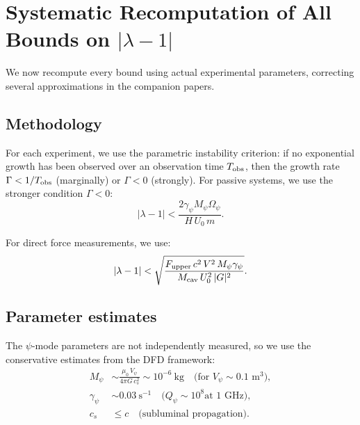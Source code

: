 \documentclass[12pt,aps,prd,twocolumn,superscriptaddress,nofootinbib]{revtex4-2}
\newcommand{\Opsi}{\Omega_\psi}
\newcommand{\gpsi}{\gamma_\psi}
\newcommand{\Mpsi}{M_\psi}
\begin{document}

\section{Systematic Recomputation of All Bounds on $|\lambda-1|$}
\label{sec:constraints}

We now recompute every bound using actual experimental parameters,
correcting several approximations in the companion papers.

\subsection{Methodology}

For each experiment, we use the parametric instability criterion:
if no exponential growth has been observed over an observation time
$T_{\rm obs}$, then the growth rate $\Gamma < 1/T_{\rm obs}$
(marginally) or $\Gamma < 0$ (strongly).  For passive systems,
we use the stronger condition $\Gamma < 0$:
\begin{equation}
|\lambda-1| < \frac{2\gpsi\Mpsi\Opsi}{H\,U_0\,m}.
\label{eq:bound_formula}
\end{equation}

For direct force measurements, we use:
\begin{equation}
|\lambda-1| < \sqrt{\frac{F_{\rm upper}\,c^2\,V^2\,\Mpsi\gpsi}
{M_{\rm cav}\,U_0^2\,|G|^2}}.
\label{eq:force_bound}
\end{equation}

\subsection{Parameter estimates}

The $\psi$-mode parameters are not independently measured, so we
use the conservative estimates from the DFD framework:
\begin{align}
\Mpsi &\sim \frac{\mu_0\,V_\psi}{4\pi G\,c_s^2}
\sim 10^{-6}~\text{kg}\quad\text{(for $V_\psi \sim 0.1$~m$^3$)},
\label{eq:Mpsi_est}\\
\gpsi &\sim 0.03~\text{s}^{-1}\quad\text{($Q_\psi \sim 10^8$
at 1~GHz)},
\label{eq:gpsi_est}\\
c_s &\leq c \quad\text{(subluminal propagation)}.
\label{eq:cs_est}
\end{align}
\end{document}
